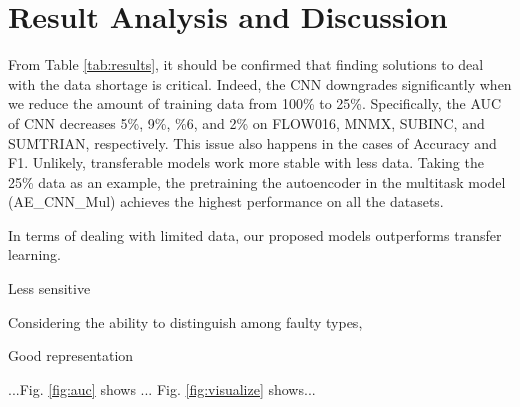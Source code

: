 \section{Result Analysis and Discussion}
\label{sec:results}
From Table \ref{tab:results}, it should be confirmed that finding solutions to deal with the data shortage is critical. Indeed, the CNN downgrades significantly when we reduce the amount of training data from 100\% to 25\%. Specifically, the AUC of CNN decreases 5\%, 9\%, \%6, and 2\% on FLOW016, MNMX, SUBINC, and SUMTRIAN, respectively. This issue also happens in the cases of Accuracy and F1. Unlikely, transferable models work more stable with less data. Taking the 25\% data as an example, the pretraining the autoencoder in the multitask model (AE\_CNN\_Mul) achieves the highest performance on all the datasets.             

In terms of dealing with limited data, our proposed models outperforms transfer learning.  

Less sensitive

Considering the ability to distinguish among faulty types, 

Good representation



...Fig. \ref{fig:auc} shows ... Fig. \ref{fig:visualize} shows...


